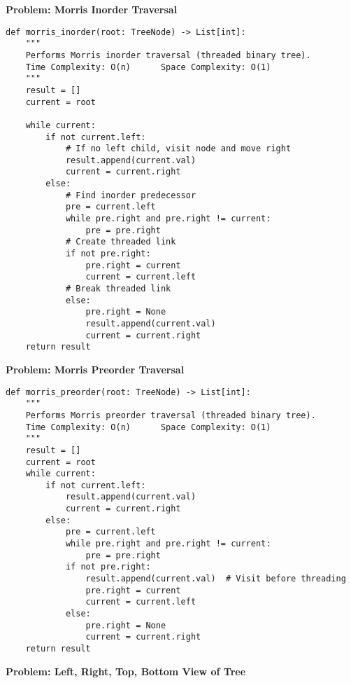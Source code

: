 \noindent\textbf{Problem: Morris Inorder Traversal}
\begin{verbatim}
def morris_inorder(root: TreeNode) -> List[int]:
    """
    Performs Morris inorder traversal (threaded binary tree).
    Time Complexity: O(n)      Space Complexity: O(1)
    """
    result = []
    current = root
    
    while current:
        if not current.left:
            # If no left child, visit node and move right
            result.append(current.val)
            current = current.right
        else:
            # Find inorder predecessor
            pre = current.left
            while pre.right and pre.right != current:
                pre = pre.right
            # Create threaded link
            if not pre.right:
                pre.right = current
                current = current.left
            # Break threaded link
            else:
                pre.right = None
                result.append(current.val)
                current = current.right
    return result
\end{verbatim}
\noindent\textbf{Problem: Morris Preorder Traversal}
\begin{verbatim}
def morris_preorder(root: TreeNode) -> List[int]:
    """
    Performs Morris preorder traversal (threaded binary tree).
    Time Complexity: O(n)      Space Complexity: O(1)
    """
    result = []
    current = root
    while current:
        if not current.left:
            result.append(current.val)
            current = current.right
        else:
            pre = current.left
            while pre.right and pre.right != current:
                pre = pre.right
            if not pre.right:
                result.append(current.val)  # Visit before threading
                pre.right = current
                current = current.left
            else:
                pre.right = None
                current = current.right
    return result
\end{verbatim}
\noindent\textbf{Problem: Left, Right, Top, Bottom View of Tree}

